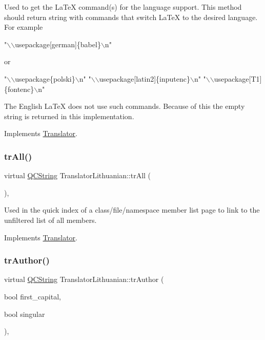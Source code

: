 Used to get the La\+TeX command(s) for the language support. This method should return string with commands that switch La\+TeX to the desired language. For example 
\begin{DoxyPre}"\(\backslash\)\(\backslash\)usepackage[german]\{babel\}\(\backslash\)n"
 \end{DoxyPre}
 or 
\begin{DoxyPre}"\(\backslash\)\(\backslash\)usepackage\{polski\}\(\backslash\)n"
 "\(\backslash\)\(\backslash\)usepackage[latin2]\{inputenc\}\(\backslash\)n"
 "\(\backslash\)\(\backslash\)usepackage[T1]\{fontenc\}\(\backslash\)n"
 \end{DoxyPre}


The English La\+TeX does not use such commands. Because of this the empty string is returned in this implementation. 

Implements \mbox{\hyperlink{class_translator}{Translator}}.

\mbox{\label{class_translator_lithuanian_a349e50c0350633f59ef5d10da429882a}} 
\subsubsection{\texorpdfstring{trAll()}{trAll()}}
{\footnotesize\ttfamily virtual \mbox{\hyperlink{class_q_c_string}{Q\+C\+String}} Translator\+Lithuanian\+::tr\+All (\begin{DoxyParamCaption}{ }\end{DoxyParamCaption})\hspace{0.3cm}{\ttfamily [inline]}, {\ttfamily [virtual]}}

Used in the quick index of a class/file/namespace member list page to link to the unfiltered list of all members. 

Implements \mbox{\hyperlink{class_translator}{Translator}}.

\mbox{\label{class_translator_lithuanian_a854d47164ed42ac11095a31509606896}} 
\subsubsection{\texorpdfstring{trAuthor()}{trAuthor()}}
{\footnotesize\ttfamily virtual \mbox{\hyperlink{class_q_c_string}{Q\+C\+String}} Translator\+Lithuanian\+::tr\+Author (\begin{DoxyParamCaption}\item[{bool}]{first\+\_\+capital,  }\item[{bool}]{singular }\end{DoxyParamCaption})\hspace{0.3cm}{\ttfamily [inline]}, {\ttfamily [virtual]}}

